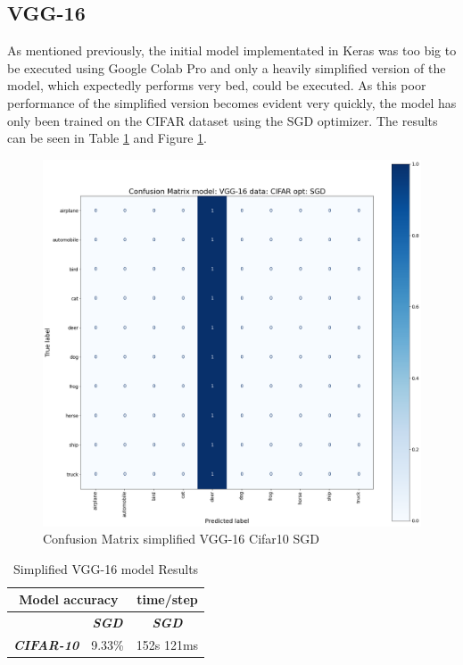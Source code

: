 \documentclass[conference]{IEEEtran}
\begin{document}
\subsection{VGG-16}
As mentioned previously, the initial  model implementated in Keras was too big to be executed using Google Colab Pro and  only a heavily simplified version of the model, which expectedly performs very bed, could be executed.
As this poor performance of the simplified  version becomes evident very quickly, the model has only been trained on the CIFAR dataset using the SGD optimizer. The results can be seen in Table \ref{tab: VGG model accuracy} and Figure \ref{fig:x matrix_VGG_CIFAR_SGD}.

\begin{figure}[!htbp]
    \centering
    \includegraphics[scale=0.1]{img/matrix_VGG_CIFAR_SGD.png}
    \caption{Confusion Matrix simplified VGG-16 Cifar10 SGD}
    \label{fig:x matrix_VGG_CIFAR_SGD}
\end{figure}

\begin{table}[!htbp]
    \caption{Simplified VGG-16 model Results}
    \begin{center}
    \begin{tabular}{|c|c|c|}
    \cline{1-3} 
    \multicolumn{2}{|c|}{\textbf{Model accuracy}} & \multicolumn{1}{|c|}{\textbf{time/step}} \\
    \hline 
    \textit{}  & \textbf{\textit{SGD}}  & \textbf{\textit{SGD}} \\
    \hline
    \textbf{\textit{CIFAR-10}} & 9.33\% & 152s 121ms \\
    \cline{1-3} 
    \end{tabular}
    \label{tab: VGG model accuracy}
    \end{center}
\end{table}
\end{document}
